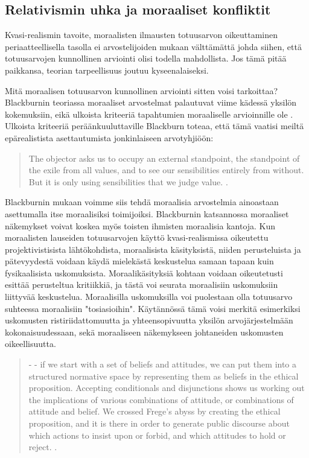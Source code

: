 \documentclass[a4paper,12pt,times,titlepage,finnish]{article}
\begin{document}
\subsection{Relativismin uhka ja moraaliset konfliktit}

Kvasi-realismin tavoite, moraalisten ilmausten totuusarvon oikeuttaminen periaatteellisella tasolla ei arvostelijoiden mukaan välttämättä johda siihen, että totuusarvojen kunnollinen arviointi olisi todella mahdollista. Jos tämä pitää paikkansa, teorian tarpeellisuus joutuu kyseenalaiseksi. 

Mitä moraalisen totuusarvon kunnollinen arviointi sitten voisi tarkoittaa? Blackburnin teoriassa moraaliset arvostelmat palautuvat viime kädessä yksilön kokemuksiin, eikä ulkoista kriteeriä tapahtumien moraaliselle arvioinnille ole \citep[ks.][112]{Youn05}. Ulkoista kriteeriä peräänkuuluttaville Blackburn toteaa, että tämä vaatisi meiltä epärealistista asettautumista jonkinlaiseen arvotyhjiöön: 

\begin{quote}
 The objector asks us to occupy an external standpoint, the standpoint of the exile from all values, and to see our sensibilities entirely from without. But it is only using sensibilities that we judge value. \citep[89]{Blackburn96}. 
\end{quote}

Blackburnin mukaan voimme siis tehdä moraalisia arvostelmia ainoastaan asettumalla itse moraalisiksi toimijoiksi. Blackburnin katsannossa moraaliset nä\-ke\-myk\-set voivat koskea myös toisten ihmisten moraalisia kantoja. Kun moraalisten lauseiden totuusarvojen käyttö kvasi-\-realismissa oikeutettu projektivistisista lähtökohdista, moraalisista kä\-si\-tyk\-sis\-tä, niiden perusteluista ja pätevyydestä voi\-daan käydä mie\-le\-käs\-tä keskustelua samaan tapaan kuin fysikaalisista uskomuksista. Moraali\-kä\-si\-tyk\-siä kohtaan voidaan oikeutetusti esittää perusteltua kritiikkiä, ja tästä voi seurata moraalisiin uskomuksiin liittyvää keskustelua. Moraalisilla uskomuksilla voi puolestaan olla totuusarvo suhteessa moraalisiin "tosiasioihin". Käy\-tän\-nös\-sä tämä voisi merkitä esimerkiksi uskomusten ristiriidattomuutta ja yhteensopivuutta yksilön arvojärjestelmään kokonaisuudessaan, sekä moraaliseen näkemykseen johtaneiden uskomusten oikeellisuutta.

\begin{quote}
	- - if we start with a set of beliefs and attitudes, we can put them into a structured normative space by representing them as beliefs in the ethical proposition. Accepting conditionals and disjunctions shows us working out the implications of various combinations of attitude, or combinations of attitude and belief. We crossed Frege's abyss by creating the ethical proposition, and it is there in order to generate public discourse about which actions to insist upon or forbid, and which attitudes to hold or reject. \citep[73]{Blackburn98}.
\end{quote}
\end{document}

